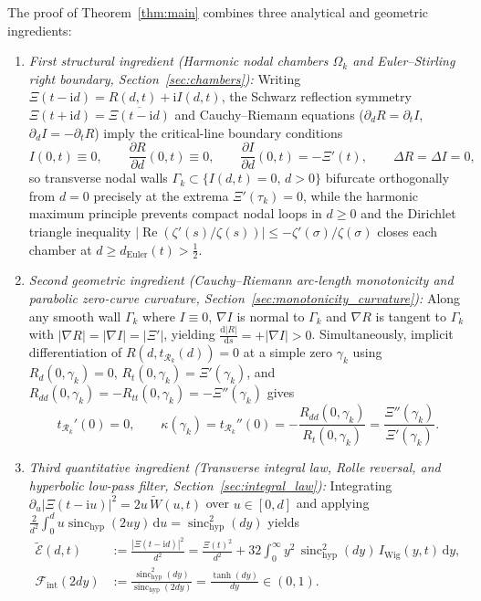 \documentclass[11pt,a4paper,reqno]{amsart}
\theoremstyle{definition}
\theoremstyle{remark}
\numberwithin{equation}{section}
\newcommand{\dd}{\mathrm{d}}
\newcommand{\ii}{\mathrm{i}}
\newcommand{\Rea}{\operatorname{Re}}
\newcommand{\Wtil}{\widetilde{W}}
\newcommand{\Etil}{\widetilde{\mathcal{E}}}
\newcommand{\sinch}{\operatorname{sinc}_{\mathrm{hyp}}}
\newcommand{\Fint}{\mathcal{F}_{\mathrm{int}}}
\begin{document}
The proof of Theorem~\ref{thm:main} combines three analytical and geometric ingredients:
\begin{enumerate}
\item \emph{First structural ingredient (Harmonic nodal chambers $\Omega_k$ and Euler--Stirling right boundary, Section~\ref{sec:chambers}):} Writing $\Xi(t-\ii d) = R(d,t) + \ii I(d,t)$, the Schwarz reflection symmetry $\Xi(t+\ii d) = \overline{\Xi(t-\ii d)}$ and Cauchy--Riemann equations ($\partial_d R = \partial_t I$, $\partial_d I = -\partial_t R$) imply the critical-line boundary conditions
\begin{equation}\label{eq:ingred1}
I(0,t) \equiv 0, \qquad \frac{\partial R}{\partial d}(0,t) \equiv 0, \qquad \frac{\partial I}{\partial d}(0,t) = -\Xi'(t), \qquad \Delta R = \Delta I = 0,
\end{equation}
so transverse nodal walls $\Gamma_k \subset \{I(d,t) = 0,\, d > 0\}$ bifurcate orthogonally from $d = 0$ precisely at the extrema $\Xi'(\tau_k) = 0$, while the harmonic maximum principle prevents compact nodal loops in $d \ge 0$ and the Dirichlet triangle inequality $|\Rea(\zeta'(s)/\zeta(s))| \le -\zeta'(\sigma)/\zeta(\sigma)$ closes each chamber at $d \ge d_{\mathrm{Euler}}(t) > \frac{1}{2}$.
\item \emph{Second geometric ingredient (Cauchy--Riemann arc-length monotonicity and parabolic zero-curve curvature, Section~\ref{sec:monotonicity_curvature}):} Along any smooth wall $\Gamma_k$ where $I \equiv 0$, $\nabla I$ is normal to $\Gamma_k$ and $\nabla R$ is tangent to $\Gamma_k$ with $|\nabla R| = |\nabla I| = |\Xi'|$, yielding $\frac{\dd|R|}{\dd s} = +|\nabla I| > 0$. Simultaneously, implicit differentiation of $R(d, t_{\mathcal{R}_k}(d)) = 0$ at a simple zero $\gamma_k$ using $R_d(0,\gamma_k) = 0$, $R_t(0,\gamma_k) = \Xi'(\gamma_k)$, and $R_{dd}(0,\gamma_k) = -R_{tt}(0,\gamma_k) = -\Xi''(\gamma_k)$ gives
\begin{equation}\label{eq:ingred2}
t_{\mathcal{R}_k}'(0) = 0, \qquad \kappa(\gamma_k) = t_{\mathcal{R}_k}''(0) = -\frac{R_{dd}(0,\gamma_k)}{R_t(0,\gamma_k)} = \frac{\Xi''(\gamma_k)}{\Xi'(\gamma_k)}.
\end{equation}
\item \emph{Third quantitative ingredient (Transverse integral law, Rolle reversal, and hyperbolic low-pass filter, Section~\ref{sec:integral_law}):} Integrating $\partial_u|\Xi(t-\ii u)|^2 = 2u\,\Wtil(u,t)$ over $u \in [0,d]$ and applying $\frac{2}{d^2}\int_0^d u\sinch(2u y)\,\dd u = \sinch^2(d y)$ yields
\begin{equation}\label{eq:ingred3}
\begin{aligned}
\Etil(d,t) &:= \frac{|\Xi(t-\ii d)|^2}{d^2} = \frac{\Xi(t)^2}{d^2} + 32\int_0^\infty y^2\,\sinch^2(d y)\,I_{\mathrm{Wig}}(y,t)\,\dd y, \\
\Fint(2d y) &:= \frac{\sinch^2(d y)}{\sinch(2d y)} = \frac{\tanh(d y)}{d y} \in (0,1).
\end{aligned}
\end{equation}
\end{enumerate}
\end{document}
